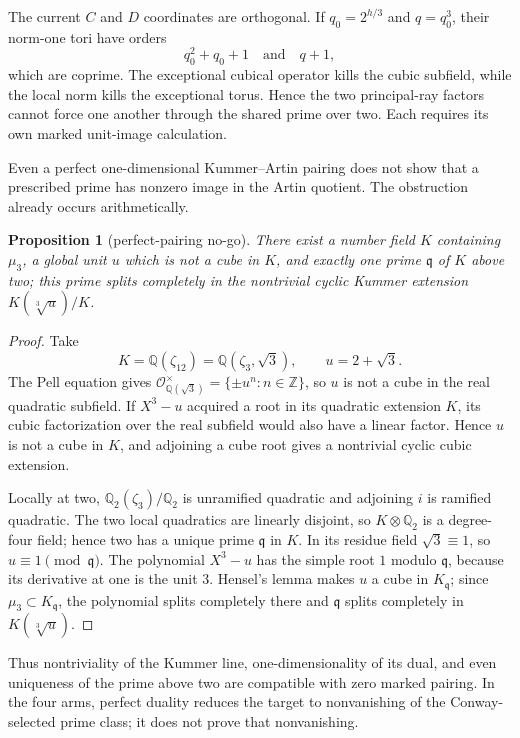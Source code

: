 \documentclass[11pt]{article}
\newtheorem{proposition}[theorem]{Proposition}
\theoremstyle{definition}
\theoremstyle{remark}
\begin{document}
The current $C$ and $D$ coordinates are orthogonal.  If
$q_0=2^{h/3}$ and $q=q_0^3$, their norm-one tori have orders
\[
 q_0^2+q_0+1
 \quad\text{and}\quad q+1,
\]
which are coprime.  The exceptional cubical operator kills the cubic
subfield, while the local norm kills the exceptional torus.  Hence the two
principal-ray factors cannot force one another through the shared prime over
two.  Each requires its own marked unit-image calculation.

Even a perfect one-dimensional Kummer--Artin pairing does not show that a
prescribed prime has nonzero image in the Artin quotient.  The obstruction
already occurs arithmetically.

\begin{proposition}[perfect-pairing no-go]\label{prop:pairing-no-go}
There exist a number field $K$ containing $\mu_3$, a global unit $u$ which is
not a cube in $K$, and exactly one prime $\mathfrak q$ of $K$ above two; this
prime splits completely in the nontrivial cyclic Kummer extension
$K(\sqrt[3]{u})/K$.
\end{proposition}

\begin{proof}
Take
\[
 K=\mathbb Q(\zeta_{12})=\mathbb Q(\zeta_3,\sqrt3),
 \qquad u=2+\sqrt3.
\]
The Pell equation gives
$\mathcal O_{\mathbb Q(\sqrt3)}^\times=\{\mathord\pm u^n:n\in\mathbb Z\}$,
so $u$ is not a cube in the real quadratic subfield.  If $X^3-u$ acquired a
root in its quadratic extension $K$, its cubic factorization over the real
subfield would also have a linear factor.  Hence $u$ is not a cube in $K$,
and adjoining a cube root gives a nontrivial cyclic cubic extension.

Locally at two, $\mathbb Q_2(\zeta_3)/\mathbb Q_2$ is unramified quadratic
and adjoining $i$ is ramified quadratic.  The two local quadratics are
linearly disjoint, so $K\otimes\mathbb Q_2$ is a degree-four field; hence two
has a unique prime $\mathfrak q$ in $K$.  In its residue field
$\sqrt3\equiv1$, so $u\equiv1\pmod{\mathfrak q}$.  The polynomial $X^3-u$
has the simple root $1$ modulo $\mathfrak q$, because its derivative at one
is the unit $3$.  Hensel's lemma makes $u$ a cube in $K_{\mathfrak q}$; since
$\mu_3\subset K_{\mathfrak q}$, the polynomial splits completely there and
$\mathfrak q$ splits completely in $K(\sqrt[3]{u})$.
\end{proof}

Thus nontriviality of the Kummer line, one-dimensionality of its dual, and
even uniqueness of the prime above two are compatible with zero marked
pairing.  In the four arms, perfect duality reduces the target to
nonvanishing of the Conway-selected prime class; it does not prove that
nonvanishing.
\end{document}
